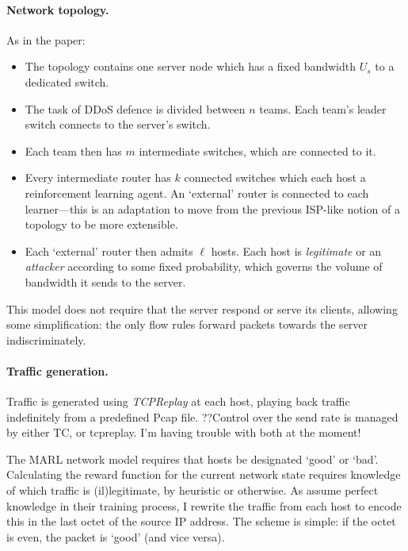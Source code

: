 \documentclass[10pt, a4paper]{article}
\begin{document}
\paragraph{Network topology.}
As in the paper:
\begin{itemize}
	\item The topology contains one server node which has a fixed bandwidth $U_s$ to a dedicated switch.
	
	\item The task of DDoS defence is divided between $n$ teams.
	Each team's leader switch connects to the server's switch.
	
	\item Each team then has $m$ intermediate switches, which are connected to it.
	
	\item Every intermediate router has $k$ connected switches which each host a reinforcement learning agent.
	An `external' router is connected to each learner---this is an adaptation to move from the previous ISP-like notion of a topology to be more extensible.
	
	\item Each `external' router then admits $\ell$ hosts.
	Each host is \emph{legitimate} or an \emph{attacker} according to some fixed probability, which governs the volume of bandwidth it sends to the server.
\end{itemize}
This model does not require that the server respond or serve its clients, allowing some simplification: the only flow rules forward packets towards the server indiscriminately.

\paragraph{Traffic generation.}
Traffic is generated using \emph{TCPReplay} at each host, playing back traffic indefinitely from a predefined Pcap file.
??Control over the send rate is managed by either TC, or tcpreplay. I'm having trouble with both at the moment!

The MARL network model requires that hosts be designated `good' or `bad'.
Calculating the reward function for the current network state requires knowledge of which traffic is (il)legitimate, by heuristic or otherwise.
As \citeauthor{DBLP:journals/eaai/MalialisK15} assume perfect knowledge in their training process, I rewrite the traffic from each host to encode this in the last octet of the source IP address.
The scheme is simple: if the octet is even, the packet is `good' (and vice versa).
\end{document}
